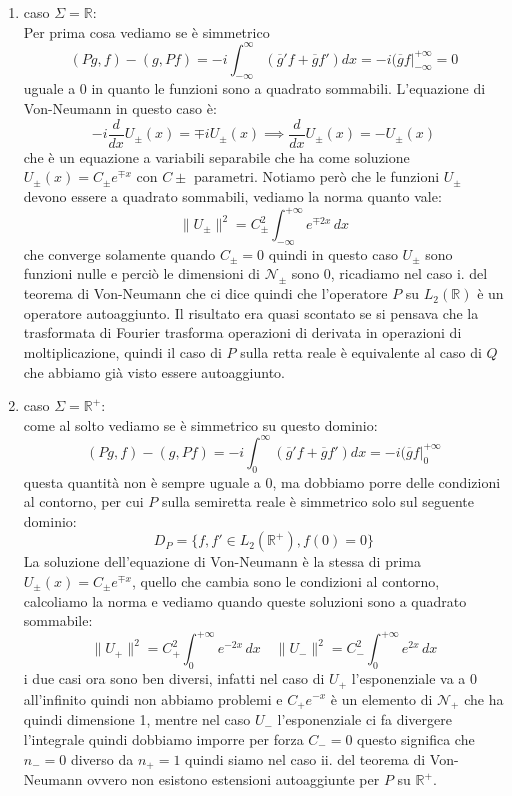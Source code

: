 \documentclass[12pt]{book}
\theoremstyle{plain}
\newcommand{\R}{\mathbb{R}}
\theoremstyle{definition}
\theoremstyle{remark}
\begin{document}
\begin{enumerate}
\item caso $\Sigma = \R$:\\
Per prima cosa vediamo se è simmetrico
\[(Pg,f)-(g,Pf) = -i\int_{-\infty}^{\infty}(\overline{g}'f + \overline{g}f')dx = -i(\overline{g}f\big|_{-\infty}^{+\infty} =0  \]
uguale a 0 in quanto le funzioni sono a quadrato sommabili. L'equazione di Von-Neumann in questo caso è:
\[-i\frac{d}{dx}U_\pm(x) = \mp iU_\pm(x) \implies \frac{d}{dx}U_\pm(x) = -U_\pm(x)\]
che è un equazione a variabili separabile che ha come soluzione $U_\pm(x) = C_\pm e^{\mp x}$ con $C\pm$ parametri. Notiamo però che le funzioni $U_\pm$ devono essere a quadrato sommabili, vediamo la norma quanto vale:
\[\|U_\pm\|^2 = C_\pm^2 \int_{-\infty}^{+\infty} e^{\mp2x}\,dx\]
che converge solamente quando $C_\pm = 0$ quindi in questo caso $U_\pm$ sono funzioni nulle e perciò le dimensioni di $\mathcal{N}_\pm$ sono 0, ricadiamo nel caso i. del teorema di Von-Neumann che ci dice quindi che l'operatore $P$ su $L_2(\R)$ è un operatore autoaggiunto. Il risultato era quasi scontato se si pensava che la trasformata di Fourier trasforma operazioni di derivata in operazioni di moltiplicazione, quindi il caso di $P$ sulla retta reale è equivalente al caso di $Q$ che abbiamo già visto essere autoaggiunto.
\item caso $\Sigma = \R^+$:\\
come al solto vediamo se è simmetrico su questo dominio:
\[(Pg,f)-(g,Pf) = -i\int_{0}^{\infty}(\overline{g}'f + \overline{g}f')dx = -i(\overline{g}f\big|_{0}^{+\infty}\]
questa quantità non è sempre uguale a 0, ma dobbiamo porre delle condizioni al contorno, per cui $P$ sulla semiretta reale è simmetrico solo sul seguente dominio:
\[D_P = \{f,f'\in L_2(\R^+), f(0)=0\}\]
La soluzione dell'equazione di Von-Neumann è la stessa di prima $U_\pm(x) = C_\pm e^{\mp x}$, quello che cambia sono le condizioni al contorno, calcoliamo la norma e vediamo quando queste soluzioni sono a quadrato sommabile:
\[\|U_+\|^2 = C_+^2 \int_{0}^{+\infty} e^{-2x}\,dx \quad \|U_-\|^2 = C_-^2 \int_{0}^{+\infty} e^{2x}\,dx\]
i due casi ora sono ben diversi, infatti nel caso di $U_+$ l'esponenziale va a 0 all'infinito quindi non abbiamo problemi e $C_+e^{-x}$ è un elemento di $\mathcal{N}_+$ che ha quindi dimensione 1, mentre nel caso $U_-$ l'esponenziale ci fa divergere l'integrale quindi dobbiamo imporre per forza $C_- = 0$ questo significa che $n_- = 0$ diverso da  $n_+ = 1$ quindi siamo nel caso ii. del teorema di Von-Neumann ovvero non esistono estensioni autoaggiunte per $P$ su $\R^+$.

\end{enumerate}
\end{document}
